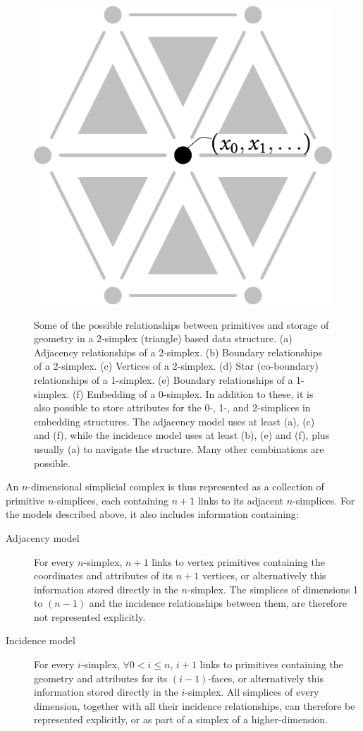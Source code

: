 \begin{figure}[tbp]
{\includegraphics[scale=0.2]{figs/0-simplex}}
\caption[Relationships in a simplex-based data structure]{Some of the possible relationships between primitives and storage of geometry in a 2-simplex (triangle) based data structure.
(a) Adjacency relationships of a 2-simplex.
(b) Boundary relationships of a 2-simplex.
(c) Vertices of a 2-simplex.
(d) Star (co-boundary) relationships of a 1-simplex.
(e) Boundary relationships of a 1-simplex.
(f) Embedding of a 0-simplex.
In addition to these, it is also possible to store attributes for the 0-, 1-, and 2-simplices in embedding structures.
The adjacency model uses at least (a), (c) and (f), while the incidence model uses at least (b), (e) and (f), plus usually (a) to navigate the structure.
Many other combinations are possible.
}
\label{fig:ds_simplex}
\end{figure}

An $n$-dimensional simplicial complex is thus represented as a collection of primitive $n$-simplices, each containing $n+1$ links to its adjacent $n$-simplices.
For the models described above, it also includes information containing:
\begin{description}
\item[Adjacency model]
For every $n$-simplex, $n+1$ links to vertex primitives containing the coordinates and attributes of its $n+1$ vertices, or alternatively this information stored directly in the $n$-simplex. The simplices of dimensions 1 to $(n-1)$ and the incidence relationships between them, are therefore not represented explicitly.
\item[Incidence model]
For every $i$-simplex, $\forall 0 < i \leq n$, $i+1$ links to primitives containing the geometry and attributes for its $(i-1)$-faces, or alternatively this information stored directly in the $i$-simplex.
All simplices of every dimension, together with all their incidence relationships, can therefore be represented explicitly, or as part of a simplex of a higher-dimension.
\end{description}

